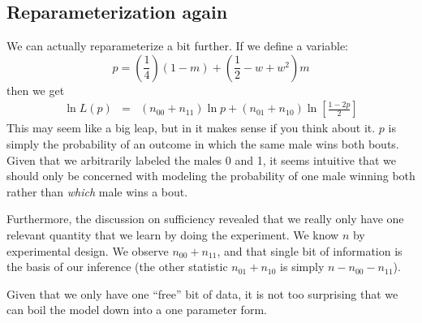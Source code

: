 \documentclass[11pt]{article}
\begin{document}
\subsection{Reparameterization again}
We can actually reparameterize a bit further.
If we define a variable:
$$ p = \left(\frac{1}{4}\right)(1-m) + \left(\frac{1}{2} -w +w^2\right)m $$
then we get
\begin{eqnarray*} 
\ln L(p) & = & (n_{00} + n_{11})\ln p  +  (n_{01} + n_{10})\ln\left[\frac{1-2p}{2}\right] \label{defP}
\end{eqnarray*}
This may seem like a big leap, but in it makes sense if you think about it.
$p$ is simply the probability of an outcome in which the same male wins both bouts.  
Given that we arbitrarily labeled the males 0 and 1, it seems intuitive that we should only be concerned with modeling the probability of one male winning both rather than {\em which} male wins a bout.

Furthermore, the discussion on sufficiency revealed that we really only have one relevant quantity that we learn by doing the experiment.
We know $n$ by experimental design.
We observe $n_{00} + n_{11}$, and that single bit of information is the basis of our inference (the other statistic $n_{01} + n_{10}$ is simply $n-n_{00} - n_{11}$).

Given that we only have one ``free'' bit of data, it is not too surprising that we can boil the model down into a one parameter form.
\end{document}
